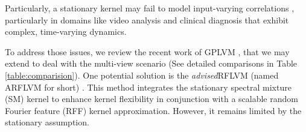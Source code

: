 Particularly, a stationary kernel may fail to model input-varying correlations \citep{remes2017non}, particularly in domains like video analysis and clinical diagnosis that exhibit complex, time-varying dynamics. 



To address those issues, we review the recent work of GPLVM \citep{lalchand2022generalised, li2024preventing, zhang2023bayesian}, that we may extend to deal with the multi-view scenario (See detailed comparisons in Table \ref{table:comparision}). One potential solution is the \textsl{advised}RFLVM (named ARFLVM for short) \citep{li2024preventing}. This method integrates the stationary spectral mixture (\MakeUppercase{sm}) kernel to enhance kernel flexibility in conjunction with a scalable random Fourier feature (RFF) kernel approximation. However, it remains limited by the stationary assumption. 

